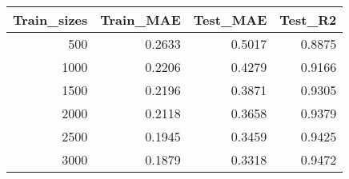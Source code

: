 \begin{tabular}{rrrr}
\toprule
Train_sizes & Train_MAE & Test_MAE & Test_R2 \\
\midrule
500 & 0.2633 & 0.5017 & 0.8875 \\
1000 & 0.2206 & 0.4279 & 0.9166 \\
1500 & 0.2196 & 0.3871 & 0.9305 \\
2000 & 0.2118 & 0.3658 & 0.9379 \\
2500 & 0.1945 & 0.3459 & 0.9425 \\
3000 & 0.1879 & 0.3318 & 0.9472 \\
\bottomrule
\end{tabular}
